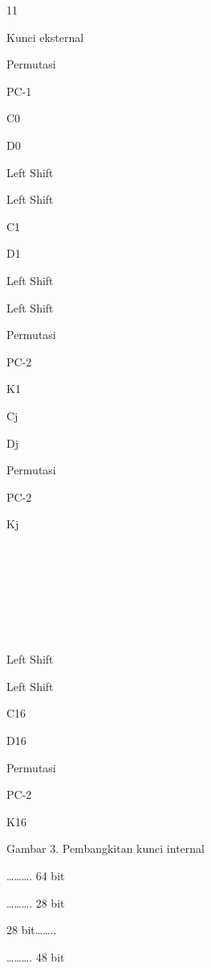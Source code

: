 \documentclass{article}
\begin{document}

11

Kunci eksternal

Permutasi

PC-1

C0

D0

Left Shift

Left Shift

C1

D1

Left Shift

Left Shift

Permutasi

PC-2

K1

Cj

Dj

Permutasi

PC-2

Kj









Left Shift

Left Shift

C16

D16

Permutasi

PC-2

K16

Gambar 3.  Pembangkitan kunci internal

………. 64 bit

………. 28 bit

28 bit……..

………. 48 bit
\end{document}
